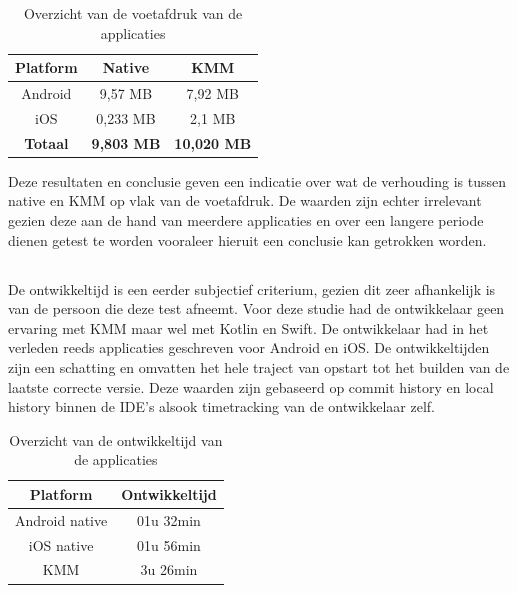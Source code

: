\begin{table}[H]
    \centering
    \caption{Overzicht van de voetafdruk van de applicaties}
    \begin{tabular}{|c|c|c|}
        \hline
        {\textbf{Platform}} & {\textbf{Native}}  & {\textbf{KMM}}\\ \hline \hline
        Android&9,57 MB&7,92 MB\\ \hline
        iOS&0,233 MB&2,1 MB\\ \hline \hline
        \textbf{Totaal}&\textbf{9,803 MB}&\textbf{10,020 MB}\\ \hline
    \end{tabular}
    \label{T:voetafruk-overzicht}
\end{table}

Deze resultaten en conclusie geven een indicatie over wat de verhouding is tussen native en KMM op vlak van de voetafdruk. De waarden zijn echter irrelevant gezien deze aan de hand van meerdere applicaties en over een langere periode dienen getest te worden vooraleer hieruit een conclusie kan getrokken worden.

\subsection{}
\label{sec:M-test-ontwikkeltijd}
De ontwikkeltijd is een eerder subjectief criterium, gezien dit zeer afhankelijk is van de persoon die deze test afneemt. Voor deze studie had de ontwikkelaar geen ervaring met KMM maar wel met Kotlin en Swift. De ontwikkelaar had in het verleden reeds applicaties geschreven voor Android en iOS. De ontwikkeltijden zijn een schatting en omvatten het hele traject van opstart tot het builden van de laatste correcte versie. Deze waarden zijn gebaseerd op commit history en local history binnen de IDE's alsook timetracking van de ontwikkelaar zelf.

\begin{table}[H]
    \centering
    \caption{Overzicht van de ontwikkeltijd van de applicaties}
    \begin{tabular}{|c|c|}
        \hline
        {\textbf{Platform}} & {\textbf{Ontwikkeltijd}}\\ \hline \hline
        Android native&01u 32min\\ \hline
        iOS native&01u 56min\\ \hline
        KMM&3u 26min\\ \hline
    \end{tabular}
    \label{T:ontwikkeltijd-overzicht}
\end{table}

